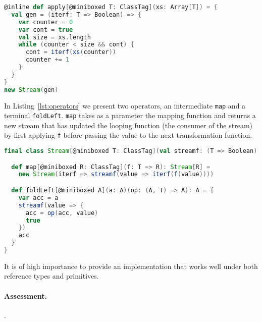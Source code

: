 \begin{lstlisting}[language=scala, caption=Creation of a stream.]
@inline def apply[@miniboxed T: ClassTag](xs: Array[T]) = {
  val gen = (iterf: T => Boolean) => {
    var counter = 0
    var cont = true
    val size = xs.length
    while (counter < size && cont) {
      cont = iterf(xs(counter))
      counter += 1
    }
  }
}
new Stream(gen)
\end{lstlisting}
In Listing~\ref{lst:operators} we present two operators, an intermediate
\verb|map| and a terminal \verb|foldLeft|. \verb|map| takes as a parameter the
mapping function and returns a new stream that has updated the looping function
(the consumer of the stream) by first applying \verb|f| before passing the value
to the next transformation function.
\begin{lstlisting}[language=scala, label=lst:operators caption=Sample operators.]
final class Stream[@miniboxed T: ClassTag](val streamf: (T => Boolean) => Unit) {

  def map[@miniboxed R: ClassTag](f: T => R): Stream[R] = 
    new Stream(iterf => streamf(value => iterf(f(value))))

  def foldLeft[@miniboxed A](a: A)(op: (A, T) => A): A = {
    var acc = a
    streamf(value => {
      acc = op(acc, value)
      true
    })
    acc
  }
}
\end{lstlisting}
It is of high importance to provide an implementation that works well under both
reference types and primitives.  
\paragraph{Assessment. } .

